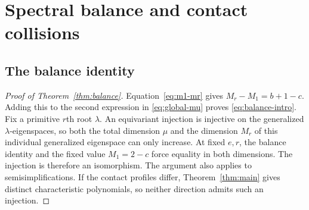 \documentclass[11pt]{article}
\numberwithin{equation}{section}
\theoremstyle{definition}
\theoremstyle{remark}
\begin{document}
\section{Spectral balance and contact collisions}\label{sec:collisions}

\subsection{The balance identity}

\begin{proof}[Proof of Theorem~\ref{thm:balance}]
Equation~\eqref{eq:m1-mr} gives $M_r-M_1=b+1-c$.
Adding this to the second expression in \eqref{eq:global-mu}
proves \eqref{eq:balance-intro}.
Fix a primitive $r$th root $\lambda$. An equivariant injection
is injective on the generalized $\lambda$-eigenspaces, so both
the total dimension $\mu$ and the dimension $M_r$ of this
individual generalized eigenspace can only increase.
At fixed $e,r$, the balance identity
and the fixed value $M_1=2-c$ force equality in both dimensions.
The injection is therefore an isomorphism. The argument also
applies to semisimplifications. If the contact profiles differ,
Theorem~\ref{thm:main} gives distinct characteristic polynomials,
so neither direction admits such an injection.
\end{proof}
\end{document}
